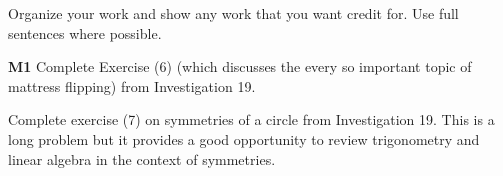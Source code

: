 \documentclass[addpoints]{exam}
\begin{document}
Organize your work and show any work that you want credit for. Use full sentences where possible.

\begin{questions}

\question \textbf{M1}
Complete Exercise (6) (which discusses the every so important topic of mattress flipping) from Investigation 19.

\question Complete exercise (7) on symmetries of a circle from Investigation 19. This is a long problem but it provides a good opportunity to review trigonometry and linear algebra in the context of symmetries.





\end{questions}
\end{document}
